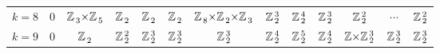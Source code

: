 \begin{tabular}{r | c c c c c c c c c c c | l}
  $k = 8$ & $0$ & $\ZZ{3}{} {\times} \ZZ{5}{}$ & $\ZZ{2}{}$ & $\ZZ{2}{}$ & $\ZZ{2}{}$ & $\ZZ{8}{} {\times} \ZZ{2}{} {\times} \ZZ{3}{}$ & $\ZZ{2}{3}$ & $\ZZ{2}{4}$ & \multicolumn{1}{c|}{$\ZZ{2}{3}$} & $\ZZ{2}{2}$ & $\cdots$ & $\ZZ{2}{2}$ \\[2pt] \hhline{~~~~~~~~~~-}
  $k = 9$ & $0$ & $\ZZ{2}{}$ & $\ZZ{2}{2}$ & $\ZZ{2}{3}$ & $\ZZ{2}{3}$ & $\ZZ{2}{3}$ & $\ZZ{2}{4}$ & $\ZZ{2}{5}$ & $\ZZ{2}{4}$ & \multicolumn{1}{c|}{\cellcolor{gray!15} $\Z {\times} \ZZ{2}{3}$} & $\ZZ{2}{3}$ & $\ZZ{2}{3}$ \\[2pt]
\end{tabular}
